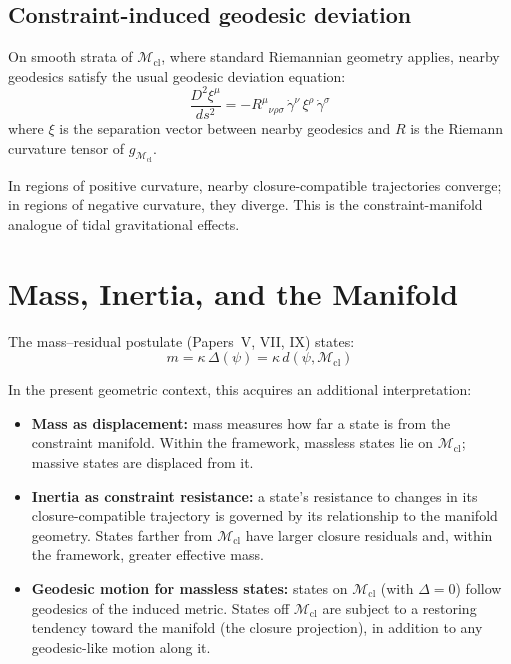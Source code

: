\documentclass[12pt]{article}
\newcommand{\Mcl}{\mathcal{M}_{\mathrm{cl}}}
\begin{document}
\subsection{Constraint-induced geodesic deviation}

On smooth strata of $\Mcl$, where standard Riemannian geometry applies, nearby geodesics satisfy the usual geodesic deviation equation:
\begin{equation}\label{eq:deviation}
    \frac{D^2 \xi^\mu}{ds^2} = -R^\mu{}_{\nu\rho\sigma}\, \dot{\gamma}^\nu\, \xi^\rho\, \dot{\gamma}^\sigma
\end{equation}
where $\xi$ is the separation vector between nearby geodesics and $R$ is the Riemann curvature tensor of $g_{\Mcl}$.

In regions of positive curvature, nearby closure-compatible trajectories converge; in regions of negative curvature, they diverge. This is the constraint-manifold analogue of tidal gravitational effects.

\section{Mass, Inertia, and the Manifold}\label{sec:mass}

The mass--residual postulate (Papers~V, VII, IX) states:
\begin{equation}
    m = \kappa\, \Delta(\psi) = \kappa\, d(\psi, \Mcl)
\end{equation}

In the present geometric context, this acquires an additional interpretation:

\begin{itemize}
    \item \textbf{Mass as displacement:} mass measures how far a state is from the constraint manifold. Within the framework, massless states lie on $\Mcl$; massive states are displaced from it.
    \item \textbf{Inertia as constraint resistance:} a state's resistance to changes in its closure-compatible trajectory is governed by its relationship to the manifold geometry. States farther from $\Mcl$ have larger closure residuals and, within the framework, greater effective mass.
    \item \textbf{Geodesic motion for massless states:} states on $\Mcl$ (with $\Delta = 0$) follow geodesics of the induced metric. States off $\Mcl$ are subject to a restoring tendency toward the manifold (the closure projection), in addition to any geodesic-like motion along it.
\end{itemize}
\end{document}
